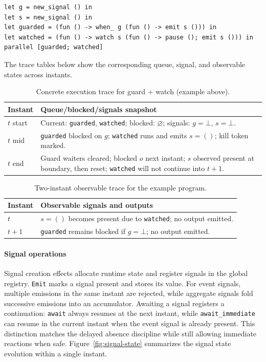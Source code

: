 \begin{lstlisting}[style=tempo]
let g = new_signal () in
let s = new_signal () in
let guarded = (fun () -> when_ g (fun () -> emit s ())) in
let watched = (fun () -> watch s (fun () -> pause (); emit s ())) in
parallel [guarded; watched]
\end{lstlisting}
The trace tables below show the corresponding queue, signal, and observable
states across instants.

\begin{table}[h]
\centering
\begin{tabularx}{\linewidth}{lY}
\hline
Instant & Queue/blocked/signals snapshot \\ \hline
$t$ start & Current: \texttt{guarded}, \texttt{watched}; blocked: $\varnothing$;
signals: $g=\bot$, $s=\bot$. \\
$t$ mid & \texttt{guarded} blocked on $g$; \texttt{watched} runs and emits $s=()$;
kill token marked. \\
$t$ end & Guard waiters cleared; blocked $o$ next instant; $s$ observed
present at boundary, then reset; \texttt{watched} will not continue into
$t{+}1$. \\ \hline
\end{tabularx}
\caption{Concrete execution trace for guard + watch (example above).}
\end{table}

\begin{table}[h]
\centering
\begin{tabularx}{\linewidth}{lY}
\hline
Instant & Observable signals and outputs \\ \hline
$t$ & $s=()$ becomes present due to \texttt{watched}; no output emitted. \\
$t{+}1$ & \texttt{guarded} remains blocked if $g=\bot$; no output emitted. \\
\hline
\end{tabularx}
\caption{Two-instant observable trace for the example program.}
\end{table}

\paragraph{Signal operations}
Signal creation effects allocate runtime state and register signals in the
global registry. \texttt{Emit} marks a signal present and stores its value.
For event signals, multiple emissions in the same instant are rejected, while
aggregate signals fold successive emissions into an accumulator. Awaiting a
signal registers a continuation: \texttt{await} always resumes at the next
instant, while \texttt{await\_immediate} can resume in the current instant when
the event signal is already present. This distinction matches the delayed
absence discipline while still allowing immediate reactions when safe.
Figure~\ref{fig:signal-state} summarizes the signal state evolution within a
single instant.

